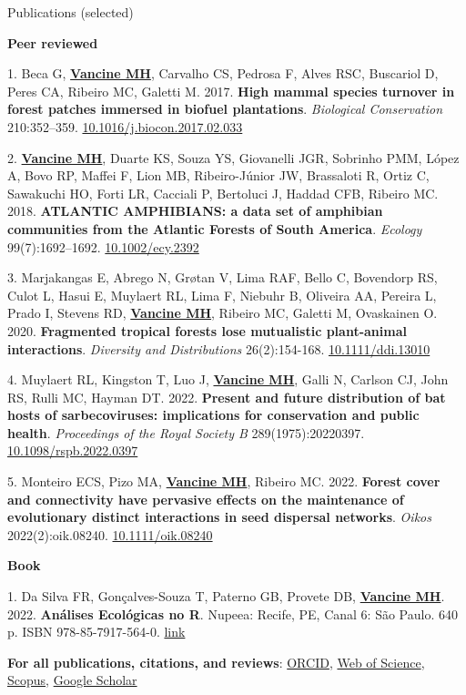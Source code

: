 \documentclass{resume}
\begin{document}

\begin{rSection}{Publications (selected)}

{\bf Peer reviewed}

1. Beca G, \underline{\bf Vancine MH}, Carvalho CS, Pedrosa F, Alves RSC, Buscariol D, Peres CA, Ribeiro MC, Galetti M. 2017. {\bf High mammal species turnover in forest patches immersed in biofuel plantations}. {\it Biological Conservation} 210:352–359. \href{https://doi.org/10.1016/j.biocon.2017.02.033}{10.1016/j.biocon.2017.02.033}

2. \underline{\bf Vancine MH}, Duarte KS, Souza YS, Giovanelli JGR, Sobrinho PMM, López A, Bovo RP, Maffei F, Lion MB, Ribeiro-Júnior JW, Brassaloti R, Ortiz C, Sawakuchi HO, Forti LR, Cacciali P, Bertoluci J, Haddad CFB, Ribeiro MC. 2018. {\bf ATLANTIC AMPHIBIANS: a data set of amphibian communities from the Atlantic Forests of South America}. {\it Ecology} 99(7):1692–1692. \href{https://doi.org/10.1002/ecy.2392}{10.1002/ecy.2392}

3. Marjakangas E, Abrego N, Grøtan V, Lima RAF, Bello C, Bovendorp RS, Culot L, Hasui E, Muylaert RL, Lima F, Niebuhr B, Oliveira AA, Pereira L, Prado I, Stevens RD, \underline{\bf Vancine MH}, Ribeiro MC, Galetti M, Ovaskainen O. 2020. {\bf Fragmented tropical forests lose mutualistic plant-animal interactions}. {\it Diversity and Distributions} 26(2):154-168. \href{https://doi.org/10.1111/ddi.13010}{10.1111/ddi.13010}

4. Muylaert RL, Kingston T, Luo J, \underline{\bf Vancine MH}, Galli N, Carlson CJ, John RS, Rulli MC, Hayman DT. 2022. {\bf Present and future distribution of bat hosts of sarbecoviruses: implications for conservation and public health}. {\it Proceedings of the Royal Society B} 289(1975):20220397. \href{https://doi.org/10.1098/rspb.2022.0397}{10.1098/rspb.2022.0397}

5. Monteiro ECS, Pizo MA, \underline{\bf Vancine MH}, Ribeiro MC. 2022. {\bf Forest cover and connectivity have pervasive effects on the maintenance of evolutionary distinct interactions in seed dispersal networks}. {\it Oikos} 2022(2):oik.08240. \href{https://doi.org/10.1111/oik.08240}{10.1111/oik.08240}

{\bf Book}

1. Da Silva FR, Gonçalves-Souza T, Paterno GB, Provete DB, \underline{\bf Vancine MH}. 2022. {\bf Análises Ecológicas no R}. Nupeea: Recife, PE, Canal 6: São Paulo. 640 p. ISBN 978-85-7917-564-0. \href{https://analises-ecologicas.com/}{link}

{\bf For all publications, citations, and reviews}: \href{https://orcid.org/0000-0001-9650-7575}{ORCID}, \href{https://www.webofscience.com/wos/author/record/837504}{Web of Science}, \href{https://www.scopus.com/authid/detail.uri?authorId=57193451888}{Scopus}, \href{https://scholar.google.com/citations?user=i-2xZBQAAAAJ}{Google Scholar}

\end{rSection}
\end{document}
